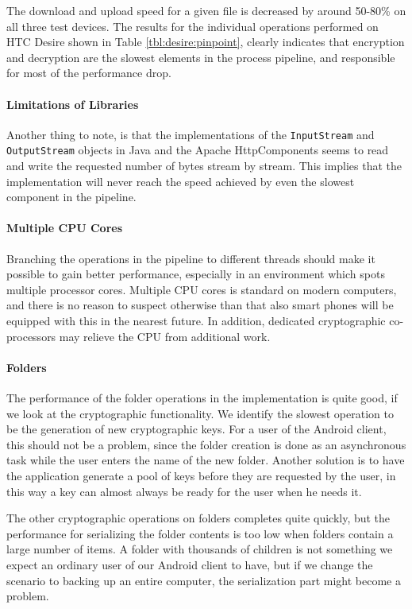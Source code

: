 \documentclass[pdftex,english,10pt,b5paper,twoside]{book}
\begin{document}
The download and upload speed for a given file is decreased by around
50-80\% on all three test devices. The results for the individual operations
performed on HTC Desire shown in Table \ref{tbl:desire:pinpoint}, clearly
indicates that encryption and decryption are the slowest elements in the
process pipeline, and responsible for most of the performance drop. 

\paragraph{Limitations of Libraries} Another thing to note, is that the
implementations of the \texttt{InputStream} and \texttt{OutputStream}
objects in Java and the Apache HttpComponents seems to read and write the
requested number of bytes stream by stream. This implies that the
implementation will never reach the speed achieved by even the slowest
component in the pipeline.

\paragraph{Multiple CPU Cores} Branching the operations in the pipeline to
different threads should make it possible to gain better performance,
especially in an environment which spots multiple processor cores. Multiple
\ac{CPU} cores is standard on modern computers, and there is no reason to
suspect otherwise than that also smart phones will be equipped with this in the
nearest future. In addition, dedicated cryptographic co-processors may
relieve the \ac{CPU} from additional work.

\paragraph{Folders} The performance of the folder operations in the
implementation is quite good, if we look at the cryptographic
functionality. We identify the slowest operation to be the generation of
new cryptographic keys. For a user of the Android client, this should not be a
problem, since the folder creation is done as an asynchronous task while the
user enters the name of the new folder. Another solution is to have the
application generate a pool of keys before they are requested by the user, in
this way a key can almost always be ready for the user when he needs it.

The other cryptographic operations on folders completes quite quickly, but the
performance for serializing the folder contents is too low when folders contain
a large number of items. A folder with thousands of children is not
something we expect an ordinary user of our Android client to have, but if we
change the scenario to backing up an entire computer, the serialization part
might become a problem. 
\end{document}
